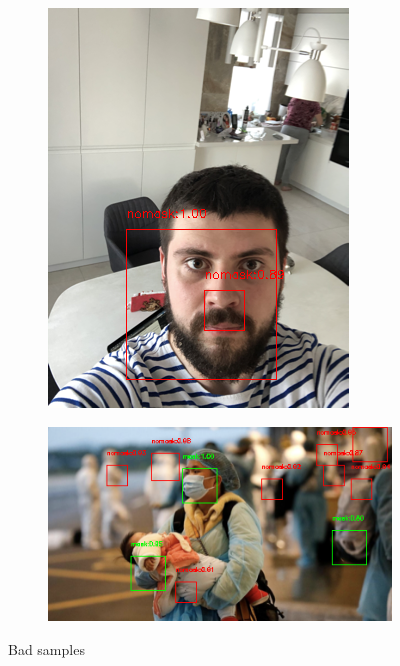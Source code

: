 \documentclass[10pt,a4paper]{report}
\begin{document}
\begin{figure}[hbtp]
\begin{subfigure}[b]{0.45\textwidth}
         \centering
         \includegraphics[width=\textwidth]{./imgs/bad/maksssksksss818.png}
     \end{subfigure}
               \hfill
     \begin{subfigure}[b]{0.45\textwidth}
         \centering
         \includegraphics[width=\textwidth]{./imgs/bad/maksssksksss846.png}
     \end{subfigure}
\caption{Bad samples}
\label{fig:good}
\end{figure}
\end{document}
